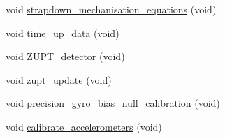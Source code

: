 \begin{DoxyCompactItemize}
\item 
void \hyperlink{group__tables_ga9169808fbcb9f517deb908960a69ca7a}{strapdown\-\_\-mechanisation\-\_\-equations} (void)
\item 
void \hyperlink{group__tables_gac80ad2aa648edb47edb8f62883cb2a7d}{time\-\_\-up\-\_\-data} (void)
\item 
void \hyperlink{group__tables_gaf0b7424f50d37755b6b0736808082299}{\-Z\-U\-P\-T\-\_\-detector} (void)
\item 
void \hyperlink{group__tables_ga0b4ee34435eebb426eb367120ee79d72}{zupt\-\_\-update} (void)
\item 
void \hyperlink{group__tables_ga71833d5eb4e7c71baaaa9e707a6c1f8d}{precision\-\_\-gyro\-\_\-bias\-\_\-null\-\_\-calibration} (void)
\item 
void \hyperlink{group__tables_gabb3f28a44a35898c77d789734914c4c2}{calibrate\-\_\-accelerometers} (void)
\end{DoxyCompactItemize}
